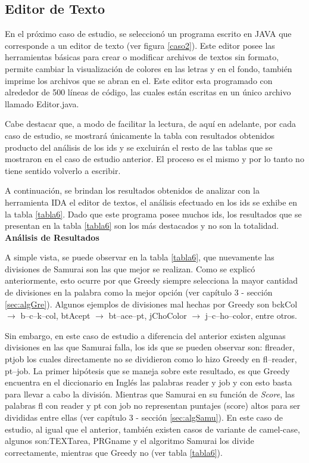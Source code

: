 \subsection{Editor de Texto}

En el próximo caso de estudio, se seleccionó un programa escrito en JAVA que corresponde a un editor de texto (ver figura \ref{caso2}). Este editor posee las herramientas básicas para crear o modificar archivos de textos sin formato, permite cambiar la visualización de colores en las letras y en el fondo, también imprime los archivos que se abran en el.
Este editor esta programado con alrededor de 500 líneas de código, las cuales están escritas en un único archivo llamado Editor.java. 

Cabe destacar que, a modo de facilitar la lectura, de aquí en adelante, por cada caso de estudio, se mostrará únicamente la tabla con resultados obtenidos producto del análisis de los ids y se excluirán el resto de las tablas que se mostraron en el caso de estudio anterior. El proceso es el mismo y por lo tanto no tiene sentido volverlo a escribir.

A continuación, se brindan los resultados obtenidos de analizar con la herramienta IDA el editor de textos, el análisis efectuado en los ids se exhibe en la tabla \ref{tabla6}. Dado que este programa posee muchos ids, los resultados que se presentan en la tabla \ref{tabla6} son los más destacados y no son la totalidad.\\

\noindent \textbf{Análisis de Resultados\\}

A simple vista, se puede observar en la tabla \ref{tabla6}, que nuevamente las divisiones de Samurai son las que mejor se realizan.
Como se explicó anteriormente, esto ocurre por que Greedy siempre selecciona la mayor cantidad de divisiones en la palabra como la mejor opción (ver capítulo 3 - sección \ref{sec:algGre}). Algunos ejemplos de divisiones mal hechas por Greedy son \textsf{bckCol} $\rightarrow$ \textsf{b--c--k--col},
\textsf{btAcept} $\rightarrow$ \textsf{bt--ace--pt}, \textsf{jChoColor} $\rightarrow$ \textsf{j--c--ho--color}, entre otros. 

Sin embargo, en este caso de estudio a diferencia del anterior existen algunas divisiones en las que Samurai falla, los ids que se pueden observar son: \textsf{flreader}, \textsf{ptjob} los cuales directamente no se dividieron como lo hizo Greedy en \mbox{\textsf{fl--reader}}, \textsf{pt--job}. La primer hipótesis que se maneja sobre este resultado, es que Greedy encuentra en el diccionario en Inglés las palabras \textsf{reader} y \textsf{job} y con esto basta para llevar a cabo la división. Mientras que Samurai en su función de \textit{Score}, las palabras \textsf{fl} con \textsf{reader} y \textsf{pt} con \textsf{job} no representan puntajes (score) altos para ser divididas entre ellas (ver capítulo 3 - sección \ref{sec:algSamu}). En este caso de estudio, al igual que el anterior, también existen casos de variante de camel-case, algunos son:\textsf{TEXTarea}, \textsf{PRGname} y el algoritmo Samurai los divide correctamente, mientras que Greedy no (ver tabla \ref{tabla6}).

